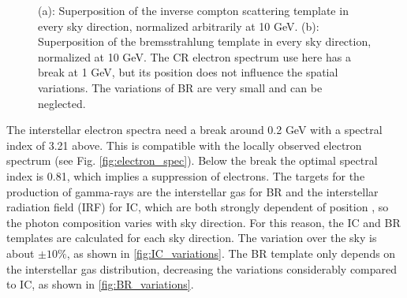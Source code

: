 \begin{figure}[h]
\begin{minipage}[h]{0.45\textwidth}
	  \subcaption{}
	  \label{fig:BR_variations}
  \end{minipage}
  \caption[Variations of the IC and BR template over the sky.]{(a): Superposition of the inverse compton scattering template in every sky direction, normalized arbitrarily at 10 GeV. (b): Superposition of the bremsstrahlung template in every sky direction, normalized at 10 GeV. The CR electron spectrum use here has a break at 1 GeV, but its position does not influence the spatial variations. The variations of BR are very small and can be neglected.}
  \label{fig:IC_BR_variations} 
\end{figure}


The interstellar electron spectra need a break around 0.2 GeV with a spectral index of 3.21 above. This is compatible with the locally observed electron spectrum (see Fig. \ref{fig:electron_spec}). Below the break the optimal spectral index is 0.81, which implies a suppression of electrons. %
The targets for the production of gamma-rays are the interstellar gas for BR and the interstellar radiation field (IRF) for IC, which are both strongly dependent of position%
, so the photon composition varies with sky direction.
For this reason, the IC and BR templates are calculated for each sky direction. The variation over the sky is about $\pm 10\%$, as shown in \ref{fig:IC_variations}. 
The BR template only depends on the interstellar gas distribution, decreasing the variations considerably compared to IC, as shown in \ref{fig:BR_variations}.







